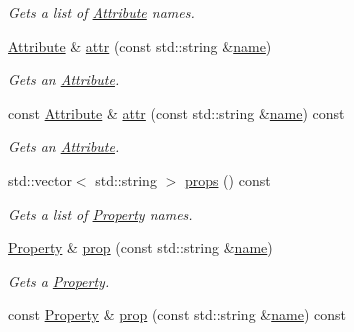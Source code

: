 \begin{DoxyCompactItemize}
\begin{DoxyCompactList}\small\item\em Gets a list of \hyperlink{classdg_1_1deepcore_1_1_attribute}{Attribute} names. \end{DoxyCompactList}\item 
\hyperlink{classdg_1_1deepcore_1_1_attribute}{Attribute} \& \hyperlink{classdg_1_1deepcore_1_1_node_ac49c9fe2e0635198b791c58060e5aad2}{attr} (const std\+::string \&\hyperlink{classdg_1_1deepcore_1_1_named_object_ab1379a28467dd39a81ceb02cf50dedde}{name})
\begin{DoxyCompactList}\small\item\em Gets an \hyperlink{classdg_1_1deepcore_1_1_attribute}{Attribute}. \end{DoxyCompactList}\item 
const \hyperlink{classdg_1_1deepcore_1_1_attribute}{Attribute} \& \hyperlink{classdg_1_1deepcore_1_1_node_a4e320551bfd987524099932d659910db}{attr} (const std\+::string \&\hyperlink{classdg_1_1deepcore_1_1_named_object_ab1379a28467dd39a81ceb02cf50dedde}{name}) const 
\begin{DoxyCompactList}\small\item\em Gets an \hyperlink{classdg_1_1deepcore_1_1_attribute}{Attribute}. \end{DoxyCompactList}\item 
std\+::vector$<$ std\+::string $>$ \hyperlink{classdg_1_1deepcore_1_1_node_a24db8fed9656e8dab99eaa0c1f02e3cb}{props} () const 
\begin{DoxyCompactList}\small\item\em Gets a list of \hyperlink{classdg_1_1deepcore_1_1_property}{Property} names. \end{DoxyCompactList}\item 
\hyperlink{classdg_1_1deepcore_1_1_property}{Property} \& \hyperlink{classdg_1_1deepcore_1_1_node_af2247893c35d4926f349f579004b22e7}{prop} (const std\+::string \&\hyperlink{classdg_1_1deepcore_1_1_named_object_ab1379a28467dd39a81ceb02cf50dedde}{name})
\begin{DoxyCompactList}\small\item\em Gets a \hyperlink{classdg_1_1deepcore_1_1_property}{Property}. \end{DoxyCompactList}\item 
const \hyperlink{classdg_1_1deepcore_1_1_property}{Property} \& \hyperlink{classdg_1_1deepcore_1_1_node_a1d2743103cf759313c06948238b04b1d}{prop} (const std\+::string \&\hyperlink{classdg_1_1deepcore_1_1_named_object_ab1379a28467dd39a81ceb02cf50dedde}{name}) const 

\end{DoxyCompactItemize}
